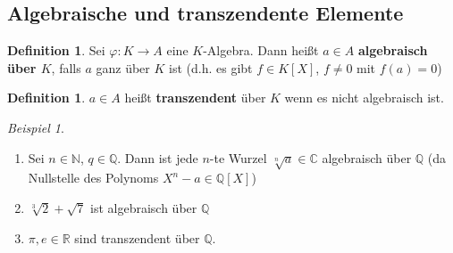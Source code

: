 \documentclass[10pt,a4paper]{article}
\newcommand{\N}{\ensuremath{\mathbb{N}}}
\newcommand{\Q}{\ensuremath{\mathbb{Q}}}
\newcommand{\R}{\ensuremath{\mathbb{R}}}
\newcommand{\C}{\ensuremath{\mathbb{C}}}
\newcounter{thm}[section]
\theoremstyle{definition}
\newtheorem{definition}[thm]{Definition}
\theoremstyle{plain}
\theoremstyle{remark}
\newtheorem{exm}[thm]{Beispiel}
\begin{document}
\subsection{Algebraische und transzendente Elemente}
\begin{definition}
	Sei $\varphi:K\to A$ eine $K$-Algebra. Dann heißt $a\in A$ \textbf{algebraisch über $K$}, falls $a$ ganz über $K$ ist (d.h. es gibt $f\in K[X]$, $f\neq 0$ mit $f(a)=0$)
\end{definition}

\addtocounter{thm}{-1}
\begin{definition}
	$a\in A$ heißt \textbf{transzendent} über $K$ wenn es nicht algebraisch ist.
\end{definition}

\begin{exm}
	\begin{enumerate}
		\item Sei $n\in\N$, $q\in\Q$. Dann ist jede $n$-te Wurzel $\sqrt[n]{a}\in\C$ algebraisch über $\Q$ (da Nullstelle des Polynoms $X^n-a\in\Q[X]$)
		\item $\sqrt[3]{2}+\sqrt{7}$ ist algebraisch über $\Q$
		\item $\pi,e\in\R$ sind transzendent über $\Q$.
	\end{enumerate}
\end{exm}
\end{document}
